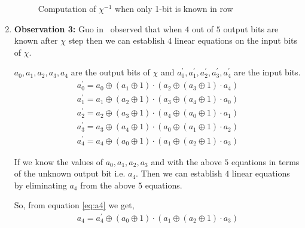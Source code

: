 \begin{enumerate}
\begin{figure}[ht]
\begin{center}
\end{center}
\caption{Computation of $\chi^{-1}$ when only 1-bit is known in row \label{chi_inv2}}
\end{figure}

\item \label{ob3}\textbf{Observation 3:} Guo \etal in~\cite{guo2016linear} observed that when $4$ out of $5$ output bits are known after $\chi$ step then we can establish $4$ linear equations on the input bits of $\chi$.

$a_0, a_1, a_2, a_3, a_4$ are the output bits of $\chi$ and $a_0^\prime, a_1^\prime, a_2^\prime, a_3^\prime, a_4^\prime$ are the input bits.
\begin{align}\label{eq:a0}
a_0^\prime = a_0 \oplus \left( a_{1} \oplus 1\right) \cdot \left( a_{2} \oplus \left( a_{3} \oplus 1 \right) \cdot a_{4}\right)
\end{align}
\begin{align}\label{eq:a1}
a_1^\prime = a_1 \oplus \left( a_{2} \oplus 1\right) \cdot \left( a_{3} \oplus \left( a_{4} \oplus 1 \right) \cdot a_{0}\right)
\end{align}
\begin{align}\label{eq:a2}
a_2^\prime = a_2 \oplus \left( a_{3} \oplus 1\right) \cdot \left( a_{4} \oplus \left( a_{0} \oplus 1 \right) \cdot a_{1}\right)
\end{align}
\begin{align}\label{eq:a3}
a_3^\prime = a_3 \oplus \left( a_{4} \oplus 1\right) \cdot \left( a_{0} \oplus \left( a_{1} \oplus 1 \right) \cdot a_{2}\right)
\end{align}
\begin{align}\label{eq:a4}
a_4^\prime = a_4 \oplus \left( a_{0} \oplus 1\right) \cdot \left( a_{1} \oplus \left( a_{2} \oplus 1 \right) \cdot a_{3}\right)
\end{align}

If we know the values of $a_0, a_1, a_2, a_3$ and with the above $5$ equations in terms of the unknown output bit i.e. $a_4$. Then we can establish $4$ linear equations by eliminating $a_4$ from the above $5$ equations.

So, from equation \ref{eq:a4} we get,
\begin{align}\label{eq:a4_2}
 a_4 = a_4^\prime \oplus \left( a_{0} \oplus 1\right) \cdot \left( a_{1} \oplus \left( a_{2} \oplus 1 \right) \cdot a_{3}\right)
\end{align}


\end{enumerate}
